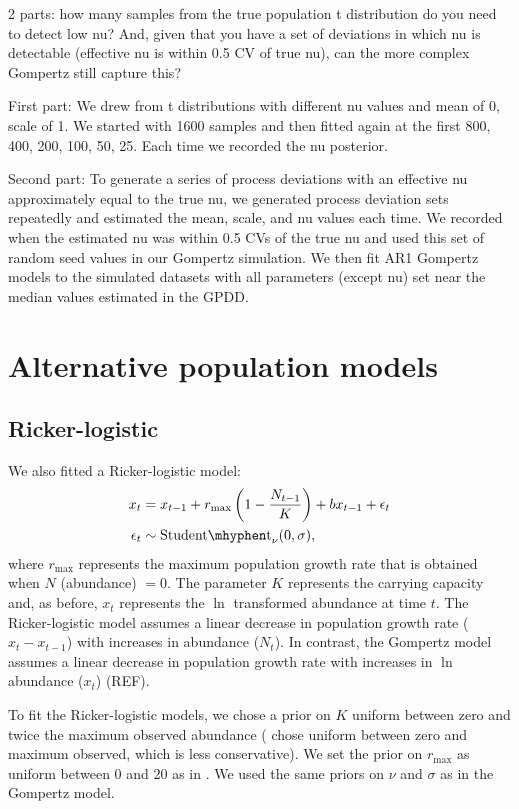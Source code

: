 \documentclass[12pt]{article}
\begin{document}
2 parts: how many samples from the true population t distribution do you need to detect low nu? And, given that you have a set of deviations in which nu is detectable (effective nu is within 0.5 CV of true nu), can the more complex Gompertz still capture this?

First part: We drew from t distributions with different nu values and mean of 0, scale of 1. We started with 1600 samples and then fitted again at the first 800, 400, 200,  100, 50, 25. Each time we recorded the nu posterior.

Second part: To generate a series of process deviations with an effective nu approximately equal to the true nu, we generated process deviation sets repeatedly and estimated the mean, scale, and nu values each time. We recorded when the estimated nu was within 0.5 CVs of the true nu and used this set of random seed values in our Gompertz simulation. We then fit AR1 Gompertz models to the simulated datasets with all parameters (except nu) set near the median values estimated in the GPDD.

\section{Alternative population models}

\subsection{Ricker-logistic}

We also fitted a Ricker-logistic model:
\begin{align*}
x_t &= x_{t-1} + r_{\mathrm{max}}\left(1 - \frac{N_{t-1}}{K}\right) + b x_{t-1} + \epsilon_t\\
\epsilon_t &\sim \mathrm{Student\mhyphen t}_\nu(0, \sigma),
\end{align*}
\noindent
where  $r_\mathrm{max}$ represents the maximum population growth rate that is obtained when $N$ (abundance) $= 0$. The parameter $K$ represents the carrying capacity and, as before, $x_t$ represents the $\ln$ transformed abundance at time $t$. The Ricker-logistic model assumes a linear decrease in population growth rate ($x_t - x_{t-1}$) with increases in abundance ($N_t$). In contrast, the Gompertz model assumes a linear decrease in population growth rate with increases in $\ln$ abundance ($x_t$) (REF).

To fit the Ricker-logistic models, we chose a prior on $K$ uniform between zero and twice the maximum observed abundance (\citet{clark2010} chose uniform between zero and maximum observed, which is less conservative). We set the prior on $r_\mathrm{max}$ as uniform between 0 and 20 as in \citet{clark2010}. We used the same priors on $\nu$ and $\sigma$ as in the Gompertz model.
\end{document}
